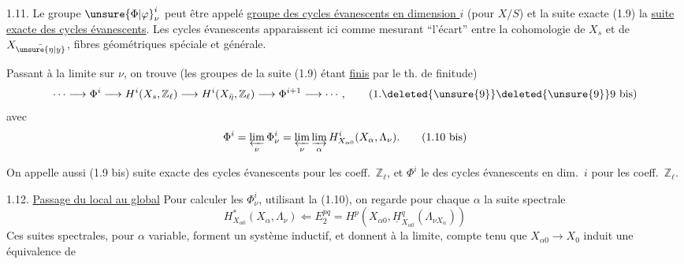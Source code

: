 1.11. Le groupe ${\unsure{\Phi|\varphi}}^i_\nu$ peut être appelé \uline{groupe des cycles évanescents en dimension $i$} (pour $X/S$) et la suite exacte (1.9) la \uline{suite exacte des cycles évanescents}. Les cycles évanescents apparaissent ici comme mesurant ``l'écart'' entre la cohomologie de $X_s$ et de $X_{\bar{\unsure{\eta|y}}}$, fibres géométriques spéciale et générale.

Passant à la limite  sur $\nu$, on trouve (les groupes de la suite (1.9) étant \uline{finis} \unsure{$\ell$)|(!)} par le th. de finitude)
\[
\cdots\longrightarrow\Phi^i\longrightarrow H^i(X_s,\mathbb Z_\ell)\longrightarrow H^i(X_{\bar\eta},\mathbb Z_\ell)\longrightarrow\Phi^{i+1}\longrightarrow\cdots,
\tag*{(1.\deleted{\unsure{9}}\deleted{\unsure{9}}9 bis)}
\]
avec
\[
\Phi^i=\varprojlim_\nu\Phi^i_\nu=\varprojlim_\nu\varinjlim_\alpha H^i_{X_{\alpha0}}(X_\alpha,\Lambda_\nu).
\tag*{(1.10 bis)}
\]

 On appelle aussi (1.9 bis) suite exacte des cycles évanescents pour les coeff.\ $\mathbb Z_\ell$, et $\Phi^i$ le  des cycles évanescents en dim.\ $i$ pour les coeff.\ $\mathbb Z_\ell$.

1.12. \uline{Passage du local au global} Pour calculer les $\Phi^i_\nu$,  utilisant la  (1.10), on regarde pour chaque $\alpha$ la suite spectrale
\[
H^*_{X_{\alpha0}}(X_\alpha,\Lambda_\nu)\Longleftarrow E_2^{pq}=H^p(X_{\alpha0},\underline H^q_{X_{\alpha0}}(\Lambda_{\nu X_\alpha}))
\tag*{(1.13)}
\]
Ces suites spectrales, pour $\alpha$ variable, forment un système inductif, et donnent à la limite, compte tenu que $X_{\alpha0}\longrightarrow X_0$ induit une équivalence de 
